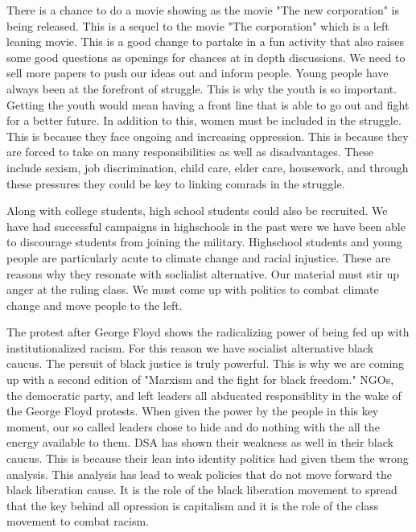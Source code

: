 \documentclass{article}
\begin{document}
There is a chance to do a movie showing as the movie "The new corporation" is being released. This is a sequel to the movie "The corporation" which is a left leaning movie. This is a good change to partake in a fun activity that also raises some good questions as openings for chances at in depth discussions. We need to sell more papers to push our ideas out and inform people. Young people have always been at the forefront of struggle. This is why the youth is so important. Getting the youth would mean having a front line that is able to go out and fight for a better future. In addition to this, women must be included in the struggle. This is because they face ongoing and increasing oppression. This is because they are forced to take on many responsibilities as well as disadvantages. These include sexism, job discrimination, child care, elder care, housework, and through these pressures they could be key to linking comrads in the struggle.

Along with college students, high school students could also be recruited. We have had successful campaigns in highschools in the past were we have been able to discourage students from joining the military. Highschool students and young people are particularly acute to climate change and racial injustice. These are reasons why they resonate with soclialist alternative. Our material must stir up anger at the ruling class. We must come up with politics to combat climate change and move people to the left.

The protest after George Floyd shows the radicalizing power of being fed up with institutionalized racism. For this reason we have socialist alternative black caucus. The persuit of black justice is truly powerful. This is why we are coming up with a second edition of "Marxism and the fight for black freedom." NGOs, the democratic party, and left leaders all abducated responsiblity in the wake of the George Floyd protests. When given the power by the people in this key moment, our so called leaders chose to hide and do nothing with the all the energy available to them. DSA has shown their weakness as well in their black caucus. This is because their lean into identity politics had given them the wrong analysis. This analysis has lead to weak policies that do not move forward the black liberation cause. It is the role of the black liberation movement to spread that the key behind all opression is capitalism and it is the role of the class movement to combat racism.
\end{document}
